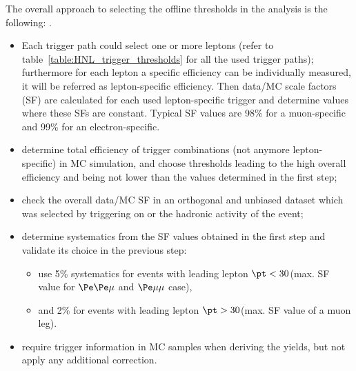 The overall approach to selecting the offline thresholds in the analysis is the following:
.


\begin{itemize}
\setlength\itemsep{-0.1em}
\item Each trigger path could select one or more leptons (refer to
  table~\ref{table:HNL_trigger_thresholds} for all the used trigger paths); furthermore for
  each lepton a specific efficiency can be individually measured, it
  will be referred as lepton-specific efficiency. Then data/MC scale
  factors (SF) are calculated for each used
  lepton-specific trigger and determine values where these SFs are
  constant. 
 Typical SF values are 98\% for a muon-specific and 99\% for an electron-specific. 
\item determine total efficiency of trigger combinations (not anymore
  lepton-specific) in MC simulation, and choose \pt thresholds leading to the high overall efficiency and being not lower than the values determined in the first step;
\item check the overall data/MC SF in an orthogonal and unbiased dataset which was
  selected by triggering on \ptmiss or the hadronic activity of the event;
\item determine systematics from the SF values obtained in the first step and validate its choice in the previous step: 
\begin{itemize}
\item use 5\% systematics for events with leading lepton $\pt < 30$\GeV (max. SF value for $\Pe\Pe\mu$ and $\Pe\mu\mu$ case),
\item and 2\% for events with leading lepton $\pt > 30$\GeV (max. SF value of a muon leg).
\end{itemize}
\item require trigger information in MC samples when deriving the yields, but not apply any additional correction.
\end{itemize}


